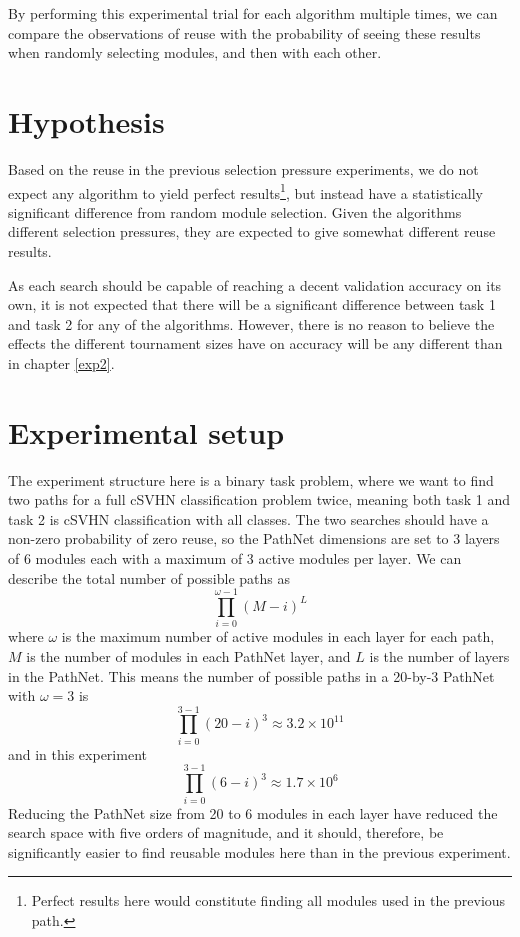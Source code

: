 By performing this experimental trial for each algorithm multiple times, we can compare the observations of reuse with the probability of seeing these results when randomly selecting modules, and then with each other. 

\section{Hypothesis}
Based on the reuse in the previous selection pressure experiments, we do not expect any algorithm to yield perfect results\footnote{Perfect results here would constitute finding all modules used in the previous path.}, but instead have a statistically significant difference from random module selection. Given the algorithms different selection pressures, they are expected to give somewhat different reuse results.

As each search should be capable of reaching a decent validation accuracy on its own, it is not expected that there will be a significant difference between task 1 and task 2 for any of the algorithms. However, there is no reason to believe the effects the different tournament sizes have on accuracy will be any different than in chapter \ref{exp2}. 

\section{Experimental setup}
\label{exp3:implementation}
The experiment structure here is a binary task problem, where we want to find two paths for a full cSVHN classification problem twice, meaning both task 1 and task 2 is cSVHN classification with all classes. The two searches should have a non-zero probability of zero reuse, so the PathNet dimensions are set to 3 layers of 6 modules each with a maximum of 3 active modules per layer. We can describe the total number of possible paths as 
\begin{equation*}
    \prod_{i=0}^{\omega-1}(M-i)^{L}
\end{equation*}
where \(\omega\) is the maximum number of active modules in each layer for each path, \(M\) is the number of modules in each PathNet layer, and  \(L\) is the number of layers in the PathNet. This means the number of possible paths in a 20-by-3 PathNet with \(\omega=3\) is  
\begin{equation*}
    \prod_{i=0}^{3-1}(20-i)^{3}\approx 3.2\times10^{11}
\end{equation*}
and in this experiment
\begin{equation*}
    \prod_{i=0}^{3-1}(6-i)^{3}\approx 1.7\times10^{6}
\end{equation*}
Reducing the PathNet size from 20 to 6 modules in each layer have reduced the search space with five orders of magnitude, and it should, therefore, be significantly easier to find reusable modules here than in the previous experiment.

